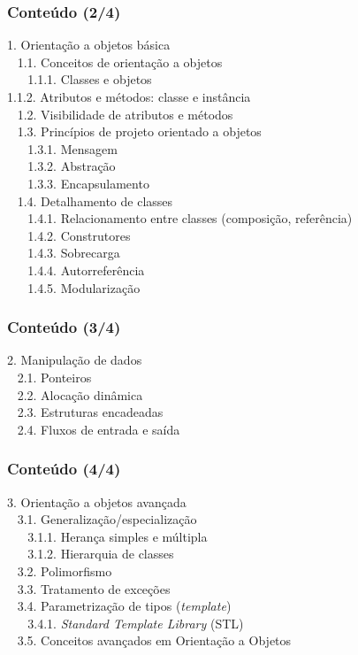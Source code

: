 \documentclass[aspectratio=169]{beamer}
\begin{document}
\begin{frame}\frametitle{Conte\'udo (2/4)}
\small{1. Orientação a objetos básica\\
~ 1.1. Conceitos de orientação a objetos\\
~ ~ 1.1.1. Classes e objetos\\
1.1.2. Atributos e métodos: classe e instância\\
~ 1.2. Visibilidade de atributos e métodos\\
~ 1.3. Princípios de projeto orientado a objetos\\
~ ~ 1.3.1. Mensagem\\
~ ~ 1.3.2. Abstração\\
~ ~ 1.3.3. Encapsulamento\\
~ 1.4. Detalhamento de classes\\
~ ~ 1.4.1. Relacionamento entre classes (composição, referência)\\
~ ~ 1.4.2. Construtores\\
~ ~ 1.4.3. Sobrecarga\\
~ ~ 1.4.4. Autorreferência\\
~ ~ 1.4.5. Modularização  }
\end{frame}


\begin{frame}\frametitle{Conte\'udo (3/4)}
2. Manipulação de dados\\
~ 2.1. Ponteiros\\
~ 2.2. Alocação dinâmica\\
~ 2.3. Estruturas encadeadas\\
~ 2.4. Fluxos de entrada e saída
\end{frame}


\begin{frame}\frametitle{Conte\'udo (4/4)}
3. Orientação a objetos avançada\\
~ 3.1. Generalização/especialização\\
~ ~ 3.1.1. Herança simples e múltipla\\
~ ~ 3.1.2. Hierarquia de classes\\
~ 3.2. Polimorfismo\\
~ 3.3. Tratamento de exceções\\
~ 3.4. Parametrização de tipos (\emph{template})\\
~ ~ 3.4.1. \emph{Standard Template Library} (STL)\\
~ 3.5. Conceitos avançados em Orientação a Objetos
\end{frame}
\end{document}
